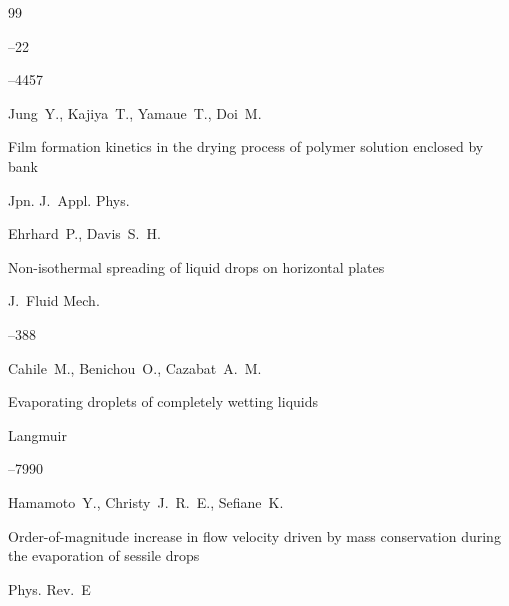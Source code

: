 \begin{thebibliography}{99}

--22

--4457





\by Jung~Y., Kajiya~T., Yamaue~T., Doi~M. 

\paper Film formation kinetics in the drying process of polymer solution enclosed by bank 

\jour Jpn. J.~Appl. Phys. 









\by Ehrhard~P., Davis~S.~H. 

\paper Non-isothermal spreading of liquid drops on horizontal plates 

\jour J.~Fluid Mech. 



--388





\by Cahile~M., Benichou~O., Cazabat~A.~M.

\paper Evaporating droplets of completely wetting liquids 

\jour Langmuir




--7990





\by Hamamoto~Y., Christy~J.~R.~E., Sefiane~K. 

\paper Order-of-magnitude increase in flow velocity driven by mass conservation during the evaporation of sessile drops 

\jour Phys. Rev.~E 



\end{thebibliography}
